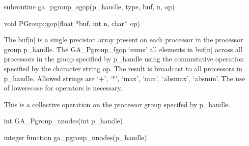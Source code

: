 \documentclass[12pt]{article}
\begin{document}
\begin{fapi}
\begin{fcode}
subroutine ga_pgroup_sgop(p_handle, type, buf, n, op)
\end{fcode}
\begin{funcargs}
\end{funcargs}
\end{fapi}

\begin{cxxapi}
\begin{cxxcode}
void PGroup::gop(float *buf, int n, char* op)
\end{cxxcode}
\begin{funcargs}
\end{funcargs}
\end{cxxapi}

\begin{desc}

The buf[n] is a single precision array present on each processor in the processor group p_handle. The GA_Pgroup_fgop `sums' all elements in buf[n] across all processors in the group specified by p_handle using the commutative operation specified by the character string op.  The result is broadcast to all processors in p_handle. Allowed strings are `+', `*', `max', `min', `absmax', `absmin'. The use of lowerecase for operators is necessary.

This is a collective operation on the processor group specifed by p_handle. 
\end{desc}


\begin{capi}
\begin{ccode}
int GA_Pgroup_nnodes(int p_handle)
\end{ccode}
\begin{funcargs}
\end{funcargs}
\end{capi}

\begin{fapi}
\begin{fcode}
integer function ga_pgroup_nnodes(p_handle)
\end{fcode}
\begin{funcargs}
\end{funcargs}
\end{fapi}
\end{document}
